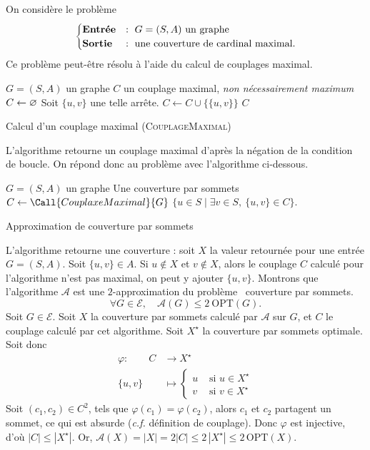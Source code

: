 \begin{exmk}
	On considère le problème \[
		\begin{cases}
			\text{\textbf{Entrée}} &:\ G = (S, A) \text{ un graphe}\\
			\text{\textbf{Sortie}}&: \text{ une couverture de cardinal maximal}.
		\end{cases}
	\]
	Ce problème peut-être résolu à l'aide du calcul de couplages maximal.
	\begin{algorithm}[H]
		\centering
		\begin{algorithmic}[1]
			\Entree $G = (S, A)$\/ un graphe
			\Sortie $C$\/ un couplage maximal, \textit{non nécessairement maximum}
			\State $C \gets \varnothing$\/ 
			\State Soit $\{u,v\}$\/ une telle arrête.
			\State $C \gets C \cup \big\{\{u,v\}\big\}$
			\EndWhile
			\State\Return $C$\/
		\end{algorithmic}
		\caption{Calcul d'un couplage maximal (\textsc{CouplageMaximal})}
	\end{algorithm}
	L'algorithme retourne un couplage maximal d'après la négation de la condition de boucle.
	On répond donc au problème avec l'algorithme ci-dessous.
	\begin{algorithm}[H]
		\centering
		\begin{algorithmic}[1]
			\Entree $G = (S, A)$\/ un graphe
			\Sortie Une couverture par sommets
			\State $C \gets \Call{CouplaxeMaximal}{G}$\/
			\State \Return $\{ u \in S  \mid \exists v \in S,\: \{u,v\} \in C\}$.
	\end{algorithmic}
		\caption{Approximation de couverture par sommets}
	\end{algorithm}
	L'algorithme retourne une couverture : soit $X$\/ la valeur retournée pour une entrée $G = (S , A)$. Soit $\{u,v\} \in A$.
	Si $u \not\in X$\/ et $v \not\in X$, alors le couplage $C$\/ calculé pour l'algorithme n'est pas maximal, on peut y ajouter $\{u,v\}$.
	Montrons que l'algorithme $\mathcal{A}$\/ est une $2$-approximation du problème \guillemotleft~couverture par sommets.~\guillemotright\ \[
		\forall G \in \mathcal{E}, \quad\mathcal{A}(G) \le 2\: \mathrm{OPT}(G)
	.\]
	Soit $G \in \mathcal{E}$. Soit $X$\/ la couverture par sommets calculé par $\mathcal{A}$\/ sur $G$, et $C$\/ le couplage calculé par cet algorithme.
	Soit $X^\star $\/ la couverture par sommets optimale.
	Soit donc \begin{align*}
		\varphi:\quad\quad C &\longrightarrow X^\star \\
		\{u,v\}  &\longmapsto \begin{cases}
			u &\text{ si } u \in X^\star \\
			v &\text{ si } v \in X^\star 
		\end{cases}
	\end{align*}
	Soit $(c_1, c_2) \in C^2$, tels que $\varphi(c_1) = \varphi(c_2)$, alors $c_1$\/ et $c_2$\/ partagent un sommet, ce qui est absurde (\textit{c.f.} définition de couplage).
	Donc $\varphi$\/ est injective, d'où  $|C| \le |X^\star|$.
	Or, $\mathcal{A}(X) = |X| = 2 |C| \le 2\,|X^\star| \le 2\,\mathrm{OPT}(X)$.
\end{exmk}


